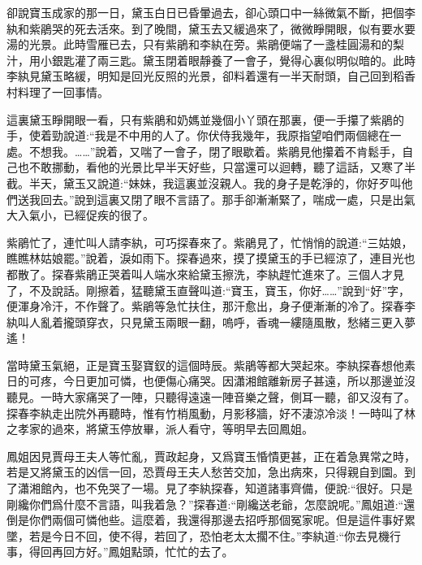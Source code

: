 \begin{parag}
    卻說寶玉成家的那一日，黛玉白日已昏暈過去，卻心頭口中一絲微氣不斷，把個李紈和紫鵑哭的死去活來。到了晚間，黛玉去又緩過來了，微微睜開眼，似有要水要湯的光景。此時雪雁已去，只有紫鵑和李紈在旁。紫鵑便端了一盞桂圓湯和的梨汁，用小銀匙灌了兩三匙。黛玉閉着眼靜養了一會子，覺得心裏似明似暗的。此時李紈見黛玉略緩，明知是回光反照的光景，卻料着還有一半天耐頭，自己回到稻香村料理了一回事情。
\end{parag}


\begin{parag}
    這裏黛玉睜開眼一看，只有紫鵑和奶媽並幾個小丫頭在那裏，便一手攥了紫鵑的手，使着勁說道:“我是不中用的人了。你伏侍我幾年，我原指望咱們兩個總在一處。不想我。……”說着，又喘了一會子，閉了眼歇着。紫鵑見他攥着不肯鬆手，自己也不敢挪動，看他的光景比早半天好些，只當還可以迴轉，聽了這話，又寒了半截。半天，黛玉又說道:“妹妹，我這裏並沒親人。我的身子是乾淨的，你好歹叫他們送我回去。”說到這裏又閉了眼不言語了。那手卻漸漸緊了，喘成一處，只是出氣大入氣小，已經促疾的很了。
\end{parag}


\begin{parag}
    紫鵑忙了，連忙叫人請李紈，可巧探春來了。紫鵑見了，忙悄悄的說道:“三姑娘，瞧瞧林姑娘罷。”說着，淚如雨下。探春過來，摸了摸黛玉的手已經涼了，連目光也都散了。探春紫鵑正哭着叫人端水來給黛玉擦洗，李紈趕忙進來了。三個人才見了，不及說話。剛擦着，猛聽黛玉直聲叫道:“寶玉，寶玉，你好……”說到“好”字，便渾身冷汗，不作聲了。紫鵑等急忙扶住，那汗愈出，身子便漸漸的冷了。探春李紈叫人亂着攏頭穿衣，只見黛玉兩眼一翻，嗚呼，香魂一縷隨風散，愁緒三更入夢遙！
\end{parag}


\begin{parag}
    當時黛玉氣絕，正是寶玉娶寶釵的這個時辰。紫鵑等都大哭起來。李紈探春想他素日的可疼，今日更加可憐，也便傷心痛哭。因瀟湘館離新房子甚遠，所以那邊並沒聽見。一時大家痛哭了一陣，只聽得遠遠一陣音樂之聲，側耳一聽，卻又沒有了。探春李紈走出院外再聽時，惟有竹梢風動，月影移牆，好不淒涼冷淡！一時叫了林之孝家的過來，將黛玉停放畢，派人看守，等明早去回鳳姐。
\end{parag}


\begin{parag}
    鳳姐因見賈母王夫人等忙亂，賈政起身，又爲寶玉惛憒更甚，正在着急異常之時，若是又將黛玉的凶信一回，恐賈母王夫人愁苦交加，急出病來，只得親自到園。到了瀟湘館內，也不免哭了一場。見了李紈探春，知道諸事齊備，便說:“很好。只是剛纔你們爲什麼不言語，叫我着急？”探春道:“剛纔送老爺，怎麼說呢。”鳳姐道:“還倒是你們兩個可憐他些。這麼着，我還得那邊去招呼那個冤家呢。但是這件事好累墜，若是今日不回，使不得，若回了，恐怕老太太擱不住。”李紈道:“你去見機行事，得回再回方好。”鳳姐點頭，忙忙的去了。
\end{parag}


